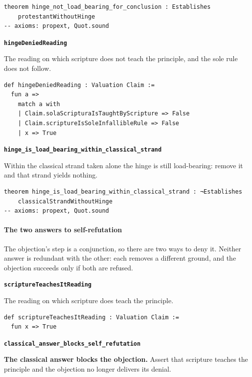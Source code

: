 \documentclass[11pt]{article}
\begin{document}
{\small\begin{verbatim}
theorem hinge_not_load_bearing_for_conclusion : Establishes
    protestantWithoutHinge
-- axioms: propext, Quot.sound
\end{verbatim}}
\par\medskip\noindent\textbf{\texttt{hinge\allowbreak{}Denied\allowbreak{}Reading}}\par\nobreak\noindent
The reading on which scripture does not teach the principle, and the sole rule does not follow.

{\small\begin{verbatim}
def hingeDeniedReading : Valuation Claim :=
  fun a =>
    match a with
    | Claim.solaScripturaIsTaughtByScripture => False
    | Claim.scriptureIsSoleInfallibleRule => False
    | x => True
\end{verbatim}}
\par\medskip\noindent\textbf{\texttt{hinge\_\allowbreak{}is\_\allowbreak{}load\_\allowbreak{}bearing\_\allowbreak{}within\_\allowbreak{}classical\_\allowbreak{}strand}}\par\nobreak\noindent
Within the classical strand taken alone the hinge is still load-bearing: remove it and that strand yields nothing.

{\small\begin{verbatim}
theorem hinge_is_load_bearing_within_classical_strand : ¬Establishes
    classicalStrandWithoutHinge
-- axioms: propext, Quot.sound
\end{verbatim}}
\paragraph*{The two answers to self-refutation}
\leavevmode\par\nobreak
The objection’s step is a conjunction, so there are two ways to deny it. Neither answer is redundant with the other: each removes a different ground, and the objection succeeds only if both are refused.

\par\medskip\noindent\textbf{\texttt{scripture\allowbreak{}Teaches\allowbreak{}It\allowbreak{}Reading}}\par\nobreak\noindent
The reading on which scripture does teach the principle.

{\small\begin{verbatim}
def scriptureTeachesItReading : Valuation Claim :=
  fun x => True
\end{verbatim}}
\par\medskip\noindent\textbf{\texttt{classical\_\allowbreak{}answer\_\allowbreak{}blocks\_\allowbreak{}self\_\allowbreak{}refutation}}\par\nobreak\noindent
\textbf{The classical answer blocks the objection.} Assert that scripture teaches the principle and the objection no longer delivers its denial.
\end{document}
